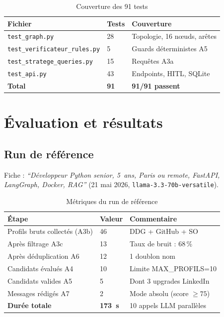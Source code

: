 \documentclass[12pt,a4paper]{report}
\begin{document}
\begin{table}[H]
\centering
\caption{Couverture des 91 tests}
\label{tab:tests}
\begin{tabularx}{\textwidth}{L{6cm}C{1.8cm}L{6cm}}
\toprule
\textbf{Fichier} & \textbf{Tests} & \textbf{Couverture} \\
\midrule
\texttt{test\_graph.py} & 28 & Topologie, 16 nœuds, arêtes \\
\texttt{test\_verificateur\_rules.py} & 5 & Guards déterministes A5 \\
\texttt{test\_stratege\_queries.py} & 15 & Requêtes A3a \\
\texttt{test\_api.py} & 43 & Endpoints, HITL, SQLite \\
\midrule
\textbf{Total} & \textbf{91} & \textbf{91/91 passent} \\
\bottomrule
\end{tabularx}
\end{table}

\chapter{Évaluation et résultats}
\label{chap:eval}

\section{Run de référence}

Fiche : \textit{``Développeur Python senior, 5~ans, Paris ou remote, FastAPI,
LangGraph, Docker, RAG''} (21 mai 2026, \texttt{llama-3.3-70b-versatile}).

\begin{table}[H]
\centering
\caption{Métriques du run de référence}
\label{tab:metriques}
\begin{tabularx}{\textwidth}{L{5.5cm}C{2.5cm}L{5cm}}
\toprule
\textbf{Étape} & \textbf{Valeur} & \textbf{Commentaire} \\
\midrule
Profils bruts collectés (A3b) & 46 & DDG + GitHub + SO \\
Après filtrage A3c & 13 & Taux de bruit : 68\,\% \\
Après déduplication A6 & 12 & 1 doublon nom \\
Candidats évalués A4 & 10 & Limite MAX\_PROFILS=10 \\
Candidats valides A5 & 5 & Dont 3 upgrades LinkedIn \\
Messages rédigés A7 & 2 & Mode absolu (score $\geq 75$) \\
\textbf{Durée totale} & \textbf{173~s} & 10 appels LLM parallèles \\
\bottomrule
\end{tabularx}
\end{table}
\end{document}
